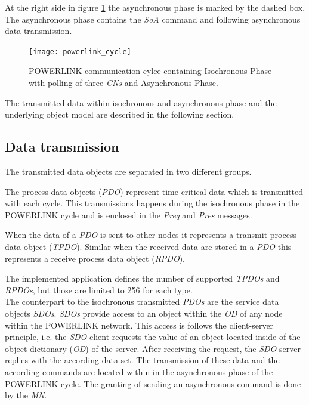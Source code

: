 At the right side in figure \ref{fig:powerlink_cycle} the asynchronous phase is marked by the dashed box.
The asynchronous phase contains the \emph{SoA} command  and following asynchronous data transmission.

\begin{figure}
    \centering
    \texttt{[image: powerlink\_cycle]}
    \caption{POWERLINK communication cylce containing Isochronous Phase with polling of three \emph{CNs} and Asynchronous Phase.}
    \label{fig:powerlink_cycle}
\end{figure}

The transmitted data within isochronous and asynchronous phase and the underlying object model are described in the following section.

\subsection{Data transmission}
\label{sec:oplk_powerlink_data_transmission}
The transmitted data objects are separated in two different groups.

The process data objects (\emph{PDO}) represent time critical data which is transmitted with each cycle.
This transmissions happens during the isochronous phase in the POWERLINK cycle and is enclosed in the \emph{Preq} and \emph{Pres} messages.

When the data of a \emph{PDO} is sent to other nodes it represents a transmit process data object (\emph{TPDO}).
Similar when the received data are stored in a \emph{PDO} this represents a receive process data object (\emph{RPDO}).

The implemented application defines the number of supported \emph{TPDOs} and \emph{RPDOs}, but those are limited to 256 for each type. \cite[section 6.4]{epsg_epsg_2013}
\\

The counterpart to the isochronous transmitted \emph{PDOs} are the service data objects \emph{SDOs}.
\emph{SDOs} provide access to an object within the \emph{OD} of any node within the POWERLINK network.
This access is follows the client-server principle, i.e. the \emph{SDO} client requests the value of an object located inside of the object dictionary (\emph{OD}) of the server.
After receiving the request, the \emph{SDO} server replies with the according data set.
The transmission of these data and the according commands are located within in the asynchronous phase of the POWERLINK cycle.
The granting of sending an asynchronous command is done by the \emph{MN}.

